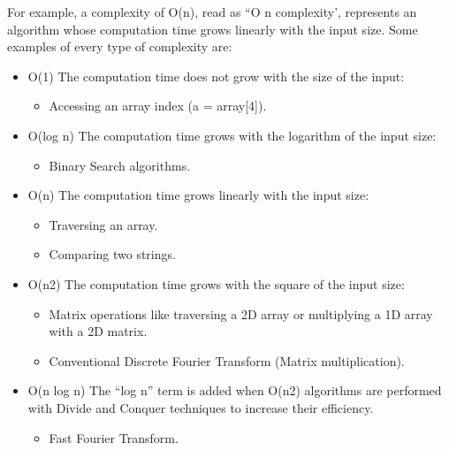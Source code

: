 \documentclass[letterpaper,10pt,english]{jupyterBook}
\begin{document}
\sphinxAtStartPar
For example, a complexity of O(n), read as “O n complexity’, represents
an algorithm whose computation time grows linearly with the input size.
Some examples of every type of complexity are:
\begin{itemize}
\item {} 
\sphinxAtStartPar
O(1) \sphinxhyphen{} The computation time does not grow with the size of the
input:
\begin{itemize}
\item {} 
\sphinxAtStartPar
Accessing an array index (a = array{[}4{]}).

\end{itemize}

\item {} 
\sphinxAtStartPar
O(log n) \sphinxhyphen{} The computation time grows with the logarithm of the
input size:
\begin{itemize}
\item {} 
\sphinxAtStartPar
Binary Search algorithms.

\end{itemize}

\item {} 
\sphinxAtStartPar
O(n) \sphinxhyphen{} The computation time grows linearly with the input size:
\begin{itemize}
\item {} 
\sphinxAtStartPar
Traversing an array.

\item {} 
\sphinxAtStartPar
Comparing two strings.

\end{itemize}

\item {} 
\sphinxAtStartPar
O(n2) \sphinxhyphen{} The computation time grows with the square of the
input size:
\begin{itemize}
\item {} 
\sphinxAtStartPar
Matrix operations like traversing a 2D array or multiplying a 1D
array with a 2D matrix.

\item {} 
\sphinxAtStartPar
Conventional Discrete Fourier Transform (Matrix
multiplication).

\end{itemize}

\item {} 
\sphinxAtStartPar
O(n log n) \sphinxhyphen{} The “log n” term is added when O(n2)
algorithms are performed with Divide and Conquer techniques to
increase their efficiency.
\begin{itemize}
\item {} 
\sphinxAtStartPar
Fast Fourier Transform.


\end{itemize}
\end{itemize}
\end{document}
